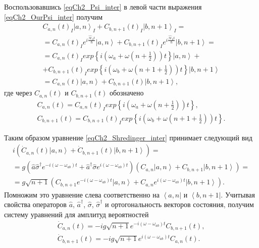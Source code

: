 Воспользовавшись \eqref{eqCh2_Psi_inter} в левой части выражения
\eqref{eqCh2_OurPsi_inter} получим 
\begin{eqnarray}
C_{a,n}\left(t\right)_I\left|a, n\right>_I +
C_{b,n+1}\left(t\right)_I\left|b, n + 1\right>_I =
\nonumber \\
= C_{a,n}\left(t\right)_I e^{i \frac{\hat{\mathcal{H}}_0
    t}{\hbar}} \left|a, n\right> +
C_{b,n+1}\left(t\right)_I e^{i \frac{\hat{\mathcal{H}}_0
    t}{\hbar}} \left|b, n + 1\right> = 
\nonumber \\
=
C_{a,n}\left(t\right)_I exp\left\{i \left(
 \omega_a +  \omega 
\left( n + \frac{1}{2}\right) 
\right) t
\right\} \left|a, n\right> +
\nonumber \\
+
C_{b,n+1}\left(t\right)_I exp\left\{i 
\left(
\omega_b +  \omega 
\left( n + 1 + \frac{1}{2}\right) 
\right)
    t \right\} \left|b, n + 1\right>
\nonumber \\
=
C_{a,n}\left(t\right) \left|a, n\right> +
C_{b,n+1}\left(t\right) \left|b, n + 1\right>,
\nonumber
\end{eqnarray}
где через $C_{a,n}\left(t\right)$ и $C_{b,n+1}\left(t\right)$
обозначено 
\begin{eqnarray}
C_{a,n}\left(t\right) = 
C_{a,n}\left(t\right)_I exp\left\{i 
\left(
\omega_a +  \omega 
\left( n + \frac{1}{2}\right) 
\right) 
    t \right\},
\nonumber \\
C_{b,n+1}\left(t\right) =
C_{b,n+1}\left(t\right)_I exp\left\{i \left(
\omega_b + \omega 
\left( n + 1 + \frac{1}{2}\right) 
\right)
    t\right\}.
\nonumber
\end{eqnarray}

Таким образом уравнение \eqref{eqCh2_Shredinger_inter} принимает
следующий вид   
\begin{eqnarray}
i \left( 
{\dot C}_{a,n}\left(t\right)\left|a, n\right> +
{\dot C}_{b,n+1}\left(t\right)\left|b, n + 1\right>
\right) =
\nonumber \\
= g \left(
\hat{a}\hat{\sigma}^{\dag} e^{-i \left(\omega - \omega_{ab}\right)t} +
\hat{a}^{\dag}\hat{\sigma} e^{i \left(\omega - \omega_{ab}\right)t}
\right) 
\left( 
C_{a,n}\left|a, n\right> +
C_{b,n+1}\left|b, n + 1\right>
\right) = 
\nonumber \\
= g \sqrt{n + 1} \left(
C_{b, n+1} e^{-i \left(\omega - \omega_{ab}\right)t} \left|a, n\right> + 
C_{a, n} e^{i \left(\omega - \omega_{ab}\right)t} \left|b, n + 1\right>
\right).
\end{eqnarray}
Помножим это уравнение слева соответственно на 
$\left<a, n\right|$ и $\left<b, n + 1\right|$.  Учитывая свойства
операторов  $\hat{a}$, $\hat{a}^{\dag}$,  $\hat{\sigma}$,
$\hat{\sigma}^{\dag}$ и ортогональность векторов состояния, получим  
систему уравнений для амплитуд вероятностей 
\begin{eqnarray}
{\dot C}_{a,n}\left(t\right) = -i g \sqrt{n + 1}
e^{-i \left(\omega - \omega_{ab}\right)t} 
C_{b, n + 1}\left(t\right),
\nonumber \\
{\dot C}_{b, n + 1}\left(t\right) = -i g \sqrt{n + 1}
e^{i \left(\omega - \omega_{ab}\right)t} 
C_{a, n}\left(t\right).
\label{eqCh2_task3}
\end{eqnarray}

